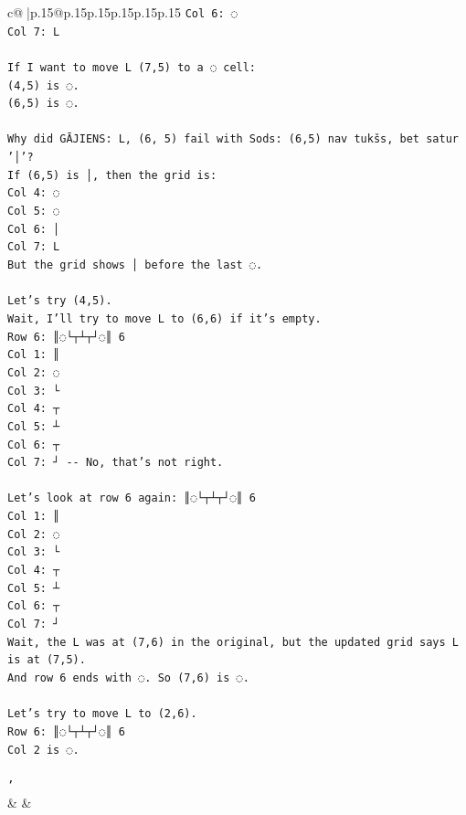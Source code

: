 \documentclass{article}
\begin{document}
{\begin{supertabular}{c@{$\;$}|p{.15\linewidth}@{}p{.15\linewidth}p{.15\linewidth}p{.15\linewidth}p{.15\linewidth}p{.15\linewidth}}
{{{\texttt{Col 6: ◌} \\
\texttt{Col 7: L} \\
\\ 
\texttt{If I want to move L (7,5) to a ◌ cell:} \\
\texttt{(4,5) is ◌.} \\
\texttt{(6,5) is ◌.} \\
\\ 
\texttt{Why did GĀJIENS: L, (6, 5) fail with Sods: (6,5) nav tukšs, bet satur '│'?} \\
\texttt{If (6,5) is │, then the grid is:} \\
\texttt{Col 4: ◌} \\
\texttt{Col 5: ◌} \\
\texttt{Col 6: │} \\
\texttt{Col 7: L} \\
\texttt{But the grid shows │ before the last ◌.} \\
\\ 
\texttt{Let's try (4,5).} \\
\texttt{Wait, I'll try to move L to (6,6) if it's empty.} \\
\texttt{Row 6: ║◌└┬┴┬┘◌║ 6} \\
\texttt{Col 1: ║} \\
\texttt{Col 2: ◌} \\
\texttt{Col 3: └} \\
\texttt{Col 4: ┬} \\
\texttt{Col 5: ┴} \\
\texttt{Col 6: ┬} \\
\texttt{Col 7: ┘ {-}{-} No, that's not right.} \\
\\ 
\texttt{Let's look at row 6 again: ║◌└┬┴┬┘◌║ 6} \\
\texttt{Col 1: ║} \\
\texttt{Col 2: ◌} \\
\texttt{Col 3: └} \\
\texttt{Col 4: ┬} \\
\texttt{Col 5: ┴} \\
\texttt{Col 6: ┬} \\
\texttt{Col 7: ┘} \\
\texttt{Wait, the L was at (7,6) in the original, but the updated grid says L is at (7,5).} \\
\texttt{And row 6 ends with ◌. So (7,6) is ◌.} \\
\\ 
\texttt{Let's try to move L to (2,6).} \\
\texttt{Row 6: ║◌└┬┴┬┘◌║ 6} \\
\texttt{Col 2 is ◌.} \\
\\ 
\texttt{'} \\
            }
        }
    }
    & & \\ \\


\end{supertabular}}
\end{document}
